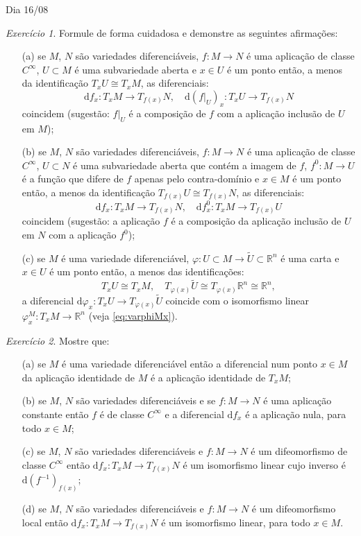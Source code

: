 \documentclass[oneside,11pt]{amsart}
\newcommand{\R}{\mathds R}
\newcommand{\dd}{\mathrm d}
\theoremstyle{remark}\newtheorem{exercise}{Exercício}[section]
\theoremstyle{plain}\newtheorem{teo}{Teorema}[section]
\theoremstyle{plain}\newtheorem{lem}[teo]{Lema}
\theoremstyle{plain}\newtheorem{prop}[teo]{Proposição}
\theoremstyle{definition}\newtheorem{defin}[teo]{Definição}
\theoremstyle{remark}\newtheorem{rem}[teo]{Observação}
\theoremstyle{definition}\newtheorem{example}[teo]{Exemplo}
\numberwithin{equation}{section}
\begin{document}
\begin{section}{Dia 16/08}
\begin{exercise}
Formule de forma cuidadosa e demonstre as seguintes afirmações:
\begin{itemize}
\item[(a)] se $M$, $N$ são variedades diferenciáveis, $f:M\to N$ é uma aplicação de classe $C^\infty$, $U\subset M$ é uma subvariedade
aberta e $x\in U$ é um ponto então, a menos da identificação $T_xU\cong T_xM$, as diferenciais:
\[\dd f_x:T_xM\longrightarrow T_{f(x)}N,\quad\dd(f\vert_U)_x:T_xU\longrightarrow T_{f(x)}N\]
coincidem (sugestão: $f\vert_U$ é a composição de $f$ com a aplicação inclusão de $U$ em $M$);
\item[(b)] se $M$, $N$ são variedades diferenciáveis, $f:M\to N$ é uma aplicação de classe $C^\infty$, $U\subset N$ é uma subvariedade
aberta que contém a imagem de $f$, $f^0:M\to U$ é a função que difere de $f$ apenas pelo contra-domínio e $x\in M$
é um ponto então, a menos da identificação $T_{f(x)}U\cong T_{f(x)}N$, as diferenciais:
\[\dd f_x:T_xM\longrightarrow T_{f(x)}N,\quad\dd f^0_x:T_xM\longrightarrow T_{f(x)}U\]
coincidem (sugestão: a aplicação $f$ é a composição da aplicação inclusão de $U$ em $N$ com a aplicação $f^0$);
\item[(c)] se $M$ é uma variedade diferenciável, $\varphi:U\subset M\to\widetilde U\subset\R^n$ é uma carta
e $x\in U$ é um ponto então, a menos das identificações:
\[T_xU\cong T_xM,\quad T_{\varphi(x)}\widetilde U\cong T_{\varphi(x)}\R^n\cong\R^n,\]
a diferencial $\dd\varphi_x:T_xU\to T_{\varphi(x)}\widetilde U$ coincide com o isomorfismo linear $\varphi^M_x:T_xM\to\R^n$
(veja \eqref{eq:varphiMx}).
\end{itemize}
\end{exercise}

\begin{exercise}\label{exe:itensdif}
Mostre que:
\begin{itemize}
\item[(a)] se $M$ é uma variedade diferenciável então a diferencial num ponto $x\in M$ da aplicação identidade
de $M$ é a aplicação identidade de $T_xM$;
\item[(b)] se $M$, $N$ são variedades diferenciáveis e se $f:M\to N$ é uma aplicação constante então
$f$ é de classe $C^\infty$ e a diferencial $\dd f_x$ é a aplicação nula, para todo $x\in M$;
\item[(c)] se $M$, $N$ são variedades diferenciáveis e $f:M\to N$ é um difeomorfismo de classe $C^\infty$ então $\dd f_x:T_xM\to T_{f(x)}N$ é um
isomorfismo linear cujo inverso é $\dd(f^{-1})_{f(x)}$;
\item[(d)] se $M$, $N$ são variedades diferenciáveis e $f:M\to N$ é um difeomorfismo local então $\dd f_x:T_xM\to T_{f(x)}N$ é
um isomorfismo linear, para todo $x\in M$.
\end{itemize}
\end{exercise}


\end{section}
\end{document}
